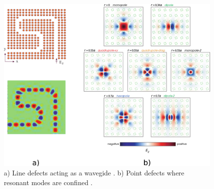 \begin{figure}
\centering
\includegraphics[scale=0.7]{./img/pcs.pdf}
\caption{a) Line defects acting as a wavegide \cite{Jin2010}. b) Point defects where resonant modes are confined \cite{Joannopoulos2008}.}
\label{fig:guide_point}
\end{figure}
